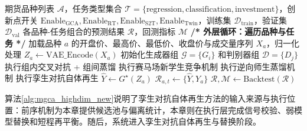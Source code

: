 \begin{algorithm}[!htbp]
\caption{孪生对抗自体再生驱动的交易执行优化流程}
\label{alg:mgca_highdim_new}
\begin{algorithmic}[0]
\Require 期货品种列表 $\mathcal{A}$，任务类型集合 $\mathcal{T} = \{\text{regression}, \text{classification}, \text{investment}\}$，创新点开关 $\text{Enable}_{\text{GCA}}, \text{Enable}_{\text{RT}}, \text{Enable}_{\text{S2T}}, \text{Enable}_{\text{Twin}}$，训练集 $\mathcal{D}_{\text{train}}$，验证集 $\mathcal{D}_{\text{val}}$
\Ensure 各品种-任务组合的预测结果 $\mathcal{R}$，回测指标 $\mathcal{M}$
\State \textbf{/* 外层循环：遍历品种与任务 */}
        \State 加载品种 $a$ 的开盘价、最高价、最低价、收盘价与成交量序列 $X_a$，归一化处理
        \State $Z_a \leftarrow \text{VAE\_Encode}(X_a)$
        \State 初始化生成器组 $\mathcal{G} = \{G_i\}$ 和判别器组 $\mathcal{D} = \{D_j\}$
            \State 执行组内交叉对抗 + 组间蒸馏
        \EndIf
            \State 执行赛马场新学生竞争机制
        \EndIf
            \State 执行逆向师生蒸馏机制
        \EndIf
            \State 执行孪生对抗自体再生
        \EndIf
        \State $\hat{Y} \leftarrow G^{\star}(Z_a)$
        \State $\mathcal{R}_{a,t} \leftarrow \{\hat{Y}, Y_a\}$
    \EndFor
\EndFor
\State \Return $\mathcal{R}, \mathcal{M} \leftarrow \text{Backtest}(\mathcal{R})$
\end{algorithmic}
\end{algorithm}

算法\ref{alg:mgca_highdim_new}说明了孪生对抗自体再生方法的输入来源与执行位置：前序机制为本章提供候选池与偏离统计，本章则在执行层完成信号校验、弱模型替换和短程再平衡。随后，系统进入孪生对抗自体再生与替换阶段。

